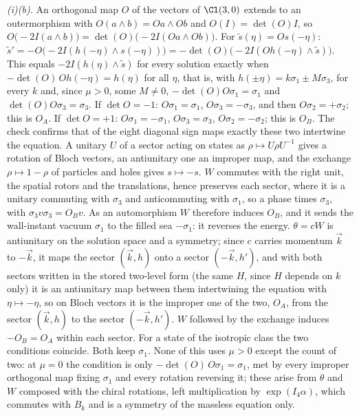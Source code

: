 \emph{(i)(b).} An orthogonal map $O$ of the vectors of $\Cl(3,0)$ extends to an outermorphism with $O(a\wedge b) = Oa\wedge Ob$ and $O(I) = \det(O)I$, so $O\bigl(-2I(a\wedge b)\bigr) = \det(O)\bigl(-2I(Oa\wedge Ob)\bigr)$. For $\tilde s(\eta) = Os(-\eta)$: $\tilde s' = -O\bigl(-2I(h(-\eta)\wedge s(-\eta))\bigr) = -\det(O)\bigl(-2I(Oh(-\eta)\wedge\tilde s)\bigr)$. This equals $-2I(h(\eta)\wedge\tilde s)$ for every solution exactly when $-\det(O)\,Oh(-\eta) = h(\eta)$ for all $\eta$, that is, with $h(\pm\eta) = k\sigma_{1} \pm M\sigma_{3}$, for every $k$ and, since $\mu > 0$, some $M \ne 0$, $-\det(O)O\sigma_{1} = \sigma_{1}$ and $\det(O)O\sigma_{3} = \sigma_{3}$. If $\det O = -1$: $O\sigma_{1} = \sigma_{1}$, $O\sigma_{3} = -\sigma_{3}$, and then $O\sigma_{2} = +\sigma_{2}$; this is $O_{A}$. If $\det O = +1$: $O\sigma_{1} = -\sigma_{1}$, $O\sigma_{3} = \sigma_{3}$, $O\sigma_{2} = -\sigma_{2}$; this is $O_{B}$. The check confirms that of the eight diagonal sign maps exactly these two intertwine the equation. A unitary $U$ of a sector acting on states as $\rho \mapsto U\rho U^{-1}$ gives a rotation of Bloch vectors, an antiunitary one an improper map, and the exchange $\rho \mapsto 1 - \rho$ of particles and holes gives $s \mapsto -s$. $W$ commutes with the right unit, the spatial rotors and the translations, hence preserves each sector, where it is a unitary commuting with $\sigma_{3}$ and anticommuting with $\sigma_{1}$, so a phase times $\sigma_{3}$, with $\sigma_{3}v\sigma_{3} = O_{B}v$. As an automorphism $W$ therefore induces $O_{B}$, and it sends the wall-instant vacuum $\sigma_{1}$ to the filled sea $-\sigma_{1}$: it reverses the energy. $\theta = cW$ is antiunitary on the solution space and a symmetry; since $c$ carries momentum $\vec k$ to $-\vec k$, it maps the sector $(\vec k, h)$ onto a sector $(-\vec k, h')$, and with both sectors written in the stored two-level form (the same $H$, since $H$ depends on $k$ only) it is an antiunitary map between them intertwining the equation with $\eta \mapsto -\eta$, so on Bloch vectors it is the improper one of the two, $O_{A}$, from the sector $(\vec k, h)$ to the sector $(-\vec k, h')$. $W$ followed by the exchange induces $-O_{B} = O_{A}$ within each sector. For a state of the isotropic class the two conditions coincide. Both keep $\sigma_{1}$. None of this uses $\mu > 0$ except the count of two: at $\mu = 0$ the condition is only $-\det(O)\,O\sigma_{1} = \sigma_{1}$, met by every improper orthogonal map fixing $\sigma_{1}$ and every rotation reversing it; these arise from $\theta$ and $W$ composed with the chiral rotations, left multiplication by $\exp(I_{4}\alpha)$, which commutes with $B_{k}$ and is a symmetry of the massless equation only.

